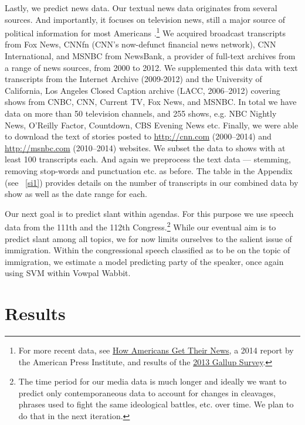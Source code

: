 \documentclass[12pt, letterpaper]{article}
\begin{document}
Lastly, we predict news data. Our textual news data originates from several sources. And importantly, it focuses on television news, still a major source of political information for most Americans \citep{chaffee1996americans}.\footnote{For more recent data, see \href{http://www.americanpressinstitute.org/publications/reports/survey-research/how-americans-get-news/}{How Americans Get Their News}, a 2014 report by the American Press Institute, and results of the \href{http://www.gallup.com/poll/163412/americans-main-source-news.aspx}{2013 Gallup Survey}.} We acquired broadcast transcripts from Fox News, CNNfn (CNN's now-defunct financial news network), CNN International, and MSNBC from NewsBank, a provider of full-text archives from a range of news sources, from 2000 to 2012. We supplemented this data with text transcripts from the Internet Archive (2009-2012) and the University of California, Los Angeles Closed Caption archive (LACC, 2006--2012) covering shows from CNBC, CNN, Current TV, Fox News, and MSNBC. In total we have data on more than 50 television channels, and 255 shows, e.g. NBC Nightly News, O'Reilly Factor, Countdown, CBS Evening News etc. Finally, we were able to download the text of stories posted to \href{CNN.com}{http://cnn.com} (2000--2014) and \href{MSNBC.com}{http://msnbc.com} (2010--2014) websites. We subset the data to shows with at least 100 transcripts each. And again we preprocess the text data --- stemming, removing stop-words and punctuation etc. as before. The table in the Appendix (see ~\ref{si1}) provides details on the number of transcripts in our combined data by show as well as the date range for each.

Our next goal is to predict slant within agendas. For this purpose we use speech data from the 111th and the 112th Congress.\footnote{The time period for our media data is much longer and ideally we want to predict only contemporaneous data to account for changes in cleavages, phrases used to fight the same ideological battles, etc. over time. We plan to do that in the next iteration.} While our eventual aim is to predict slant among all topics, we for now limits ourselves to the salient issue of immigration. Within the congressional speech classified as to be on the topic of immigration, we estimate a model predicting party of the speaker, once again using SVM within Vowpal Wabbit. 

\section*{Results}
\end{document}
